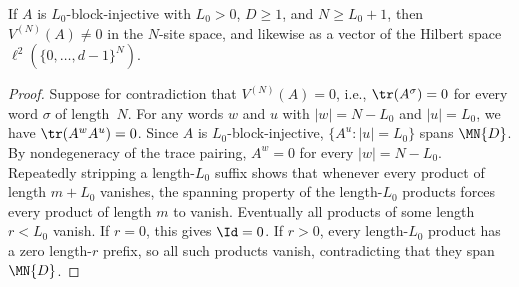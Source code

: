 \begin{lemma}%
    \label{thm:mpv_ne_zero_blk_injective}
    \leanok
    If $A$ is $L_0$-block-injective with $L_0>0$, $D\ge1$, and
    $N\ge L_0+1$, then $V^{(N)}(A)\ne0$ in the $N$-site space, and likewise
    as a vector of the Hilbert space $\ell^2(\{0,\ldots,d-1\}^N)$.
\end{lemma}

\begin{proof}
    \leanok
    Suppose for contradiction that $V^{(N)}(A)=0$, i.e.,
    $\tr(A^\sigma)=0$ for every word $\sigma$ of length~$N$. For any words $w$
    and $u$ with $|w|=N-L_0$ and $|u|=L_0$, we have
    $\tr(A^wA^u)=0$. Since $A$ is $L_0$-block-injective,
    $\{A^u:|u|=L_0\}$ spans $\MN{D}$. By nondegeneracy of the trace pairing,
    $A^w=0$ for every $|w|=N-L_0$. Repeatedly stripping a length-$L_0$ suffix
    shows that whenever every product of length $m+L_0$ vanishes, the spanning
    property of the length-$L_0$ products forces every product of length $m$ to
    vanish. Eventually all products of some length $r<L_0$ vanish. If $r=0$,
    this gives $\Id=0$. If $r>0$, every length-$L_0$ product has a zero
    length-$r$ prefix, so all such products vanish, contradicting that they
    span $\MN{D}$.
\end{proof}
